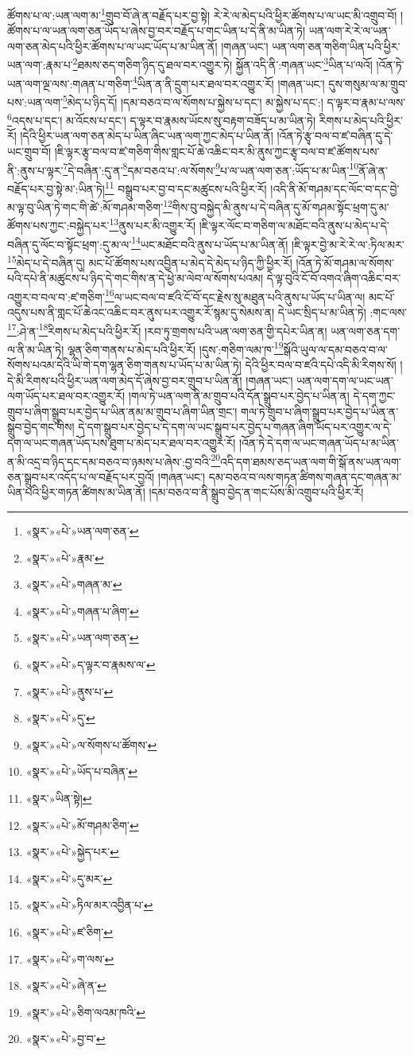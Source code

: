 ཚོགས་པ་ལ་:ཡན་ལག་མ་\footnote{«སྣར་»«པེ་»ཡན་ལག་ཅན་}གྲུབ་བོ་ཞེ་ན་བརྗོད་པར་བྱ་སྟེ། རེ་རེ་ལ་མེད་པའི་ཕྱིར་ཚོགས་པ་ལ་ཡང་མི་འགྲུབ་བོ། །ཚོགས་པ་ལ་ཡན་ལག་ཅན་ཡོད་པ་ཞེས་བྱ་བར་བརྗོད་པ་གང་ཡིན་པ་དེ་ནི་མ་ཡིན་ཏེ། ཡན་ལག་རེ་རེ་ལ་ཡན་ལག་ཅན་མེད་པའི་ཕྱིར་ཚོགས་པ་ལ་ཡང་ཡོད་པ་མ་ཡིན་ནོ། །གཞན་ཡང་། ཡན་ལག་ཅན་གཅིག་ཡིན་པའི་ཕྱིར་ཡན་ལག་:རྣམ་པ་\footnote{«སྣར་»«པེ་»རྣམ་}ཐམས་ཅད་གཅིག་ཉིད་དུ་ཐལ་བར་འགྱུར་ཏེ། སྐྱོན་འདི་ནི་:གཞན་ཡང་\footnote{«སྣར་»«པེ་»གཞན་མ་}ཡིན་པ་ལའོ། །འོན་ཏེ་ཡན་ལག་ལྔ་ལས་:གཞན་པ་གཅིག་\footnote{«སྣར་»«པེ་»གཞན་པ་ཞིག་}ཡིན་ན་ནི་དྲུག་པར་ཐལ་བར་འགྱུར་རོ། །གཞན་ཡང་། དུས་གསུམ་ལ་མ་གྲུབ་པས་:ཡན་ལག་\footnote{«སྣར་»«པེ་»ཡན་ལག་ཅན་}མེད་པ་ཉིད་དོ། །དམ་བཅའ་བ་ལ་སོགས་པ་སྐྱེས་པ་དང་། མ་སྐྱེས་པ་དང་:། ད་ལྟར་བ་རྣམ་པ་ལས་\footnote{«སྣར་»«པེ་»ད་ལྟར་བ་རྣམས་ལ་}འདས་པ་དང་། མ་འོངས་པ་དང་། ད་ལྟར་བ་རྣམས་ཡོངས་སུ་བརྟག་བཟོད་པ་མ་ཡིན་ཏེ། རིགས་པ་མེད་པའི་ཕྱིར་རོ། །དེའི་ཕྱིར་ཡན་ལག་ཅན་མེད་པ་ཡིན་ཞིང་ཡན་ལག་ཀྱང་མེད་པ་ཡིན་ནོ། །འོན་ཏེ་རྩྭ་བལ་བ་ཛ་བཞིན་དུ་དེ་ཡང་གྲུབ་བོ། །ཇི་ལྟར་རྩྭ་བལ་བ་ཛ་གཅིག་གིས་གླང་པོ་ཆེ་འཆིང་བར་མི་ནུས་ཀྱང་རྩྭ་བལ་བ་ཛ་ཚོགས་པས་ནི་:ནུས་པ་ལྟར་\footnote{«སྣར་»«པེ་»ནུས་པ་}དེ་བཞིན་:དུ་ན་\footnote{«སྣར་»«པེ་»དུ་}དམ་བཅའ་པ་:ལ་སོགས་\footnote{«སྣར་»«པེ་»ལ་སོགས་པ་ཚོགས་}པ་ལ་ཡན་ལག་ཅན་:ཡོད་པ་མ་ཡིན་\footnote{«སྣར་»«པེ་»ཡོད་པ་བཞིན་}ནོ་ཞེ་ན་བརྗོད་པར་བྱ་སྟེ་མ་:ཡིན་ཏེ།\footnote{«སྣར་»ཡིན་སྟེ།} བསྒྲུབ་པར་བྱ་བ་དང་མཚུངས་པའི་ཕྱིར་རོ། །འདི་ནི་མོ་གཤམ་དང་ལོང་བ་དང་བྱེ་མ་ལྟ་བུ་ཡིན་ཏེ་གང་གི་ཚེ་:མོ་གཤམ་གཅིག་\footnote{«སྣར་»«པེ་»མོ་གཤམ་ཅིག་}གིས་བུ་བསྐྱེད་མི་ནུས་པ་དེ་བཞིན་དུ་མོ་གཤམ་སྟོང་ཕྲག་དུ་མ་ཚོགས་པས་ཀྱང་:བསྐྱེད་པར་\footnote{«སྣར་»«པེ་»སྐྱེད་པར་}ནུས་པར་མི་འགྱུར་རོ། །ཇི་ལྟར་ལོང་བ་གཅིག་ལ་མཐོང་བའི་ནུས་པ་མེད་པ་དེ་བཞིན་དུ་ལོང་བ་སྟོང་ཕྲག་:དུ་མ་ལ་\footnote{«སྣར་»«པེ་»དུ་མར་}ཡང་མཐོང་བའི་ནུས་པ་ཡོད་པ་མ་ཡིན་ནོ། །ཇི་ལྟར་བྱེ་མ་རེ་རེ་ལ་:ཏིལ་མར་\footnote{«སྣར་»«པེ་»ཏིལ་མར་འབྱིན་པ་}མེད་པ་དེ་བཞིན་དུ། མང་པོ་ཚོགས་པས་འབྱིན་པ་མེད་དེ་མེད་པ་ཉིད་ཀྱི་ཕྱིར་རོ། །འོན་ཏེ་མོ་གཤམ་ལ་སོགས་པའི་དཔེ་ནི་མཚུངས་པ་ཉིད་དེ་གང་གིས་ན་དེ་ཕྱེ་མ་ལེབ་ལ་སོགས་པའམ། དེ་ལྟ་བུའི་ངོ་བོ་འགའ་ཞིག་འཆིང་བར་འགྱུར་བ་བལ་བ་:ཛ་གཅིག་\footnote{«སྣར་»«པེ་»ཛ་ཅིག་}ལ་ཡང་བལ་བ་ཛའི་ངོ་བོ་དང་རྗེས་སུ་མཐུན་པའི་ནུས་པ་ཡོད་པ་ཡིན་ལ། མང་པོ་འདུས་པས་ནི་གླང་པོ་ཆེའང་འཆིང་བར་ནུས་པར་འགྱུར་རོ་སྙམ་དུ་སེམས་ན། དེ་ཡང་སྲིད་པ་མ་ཡིན་ཏེ། :གང་ལས་\footnote{«སྣར་»«པེ་»ག་ལས་}:ཤེ་ན་\footnote{«སྣར་»«པེ་»ཞེ་ན་}རིགས་པ་མེད་པའི་ཕྱིར་རོ། །རབ་ཏུ་གྲགས་པའི་ཡན་ལག་ཅན་གྱི་དཔེར་ཡིན་ན། ཡན་ལག་ཅན་དག་ལ་ནི་མ་ཡིན་ཏེ། ལྷན་ཅིག་གནས་པ་མེད་པའི་ཕྱིར་རོ། །དུས་:གཅིག་ལམ་ཁ་\footnote{«སྣར་»«པེ་»ཅིག་ལའམ་ཁའི་}སྒོའི་ཡུལ་ལ་དམ་བཅའ་བ་ལ་སོགས་པའམ་དེའི་ཡི་གེ་དག་ལྷན་ཅིག་གནས་པ་ཡོད་པ་མ་ཡིན་ཏེ། དེའི་ཕྱིར་བལ་བ་ཛའི་དཔེ་འདི་མི་རིགས་སོ། །དེ་མི་རིགས་པའི་ཕྱིར་ཡན་ལག་མེད་དོ་ཞེས་བྱ་བར་གྲུབ་པ་ཡིན་ནོ། །གཞན་ཡང་། ཡན་ལག་དག་ལ་ཡང་ཡན་ལག་ཡོད་པར་ཐལ་བར་འགྱུར་རོ། །གལ་ཏེ་ཡན་ལག་ནི་མ་གྲུབ་པའི་དོན་སྒྲུབ་པར་བྱེད་པ་ཡིན་ན། དེ་དག་ཀྱང་གྲུབ་པ་ཞིག་སྒྲུབ་པར་བྱེད་པ་ཡིན་ནམ་མ་གྲུབ་པ་ཞིག་ཡིན་གྲང་། གལ་ཏེ་གྲུབ་པ་ཞིག་སྒྲུབ་པར་བྱེད་པ་ཡིན་ན་སྒྲུབ་བྱེད་གང་གིས། དེ་དག་སྒྲུབ་པར་བྱེད་པ་དེ་དག་ལ་ཡང་སྒྲུབ་པར་བྱེད་པ་གཞན་ཞིག་ཡོད་པར་འགྱུར་ལ་དེ་དག་ལ་ཡང་གཞན་ཡོད་པས་ཐུག་པ་མེད་པར་ཐལ་བར་འགྱུར་རོ། །འོན་ཏེ་དེ་དག་ལ་ཡང་གཞན་ཡོད་པ་མ་ཡིན་ན་མི་འདྲ་བ་ཉིད་དང་དམ་བཅའ་བ་ཉམས་པ་ཞེས་:བྱ་བའི་\footnote{«སྣར་»«པེ་»བྱ་བ་}འདི་དག་ཐམས་ཅད་ཡན་ལག་གི་སྒོ་ནས་ཡན་ལག་ཅན་སྒྲུབ་པར་འདོད་པ་ལ་བརྗོད་པར་བྱའོ། །གཞན་ཡང་། དམ་བཅའ་བ་ལས་གཏན་ཚིགས་གཞན་དང་གཞན་མ་ཡིན་པའི་ཕྱིར་གཏན་ཚིགས་མ་ཡིན་ནོ། །དམ་བཅའ་བ་ནི་སྒྲུབ་བྱེད་ན་གང་པོས་མི་འགྲུབ་པའི་ཕྱིར་རོ། 